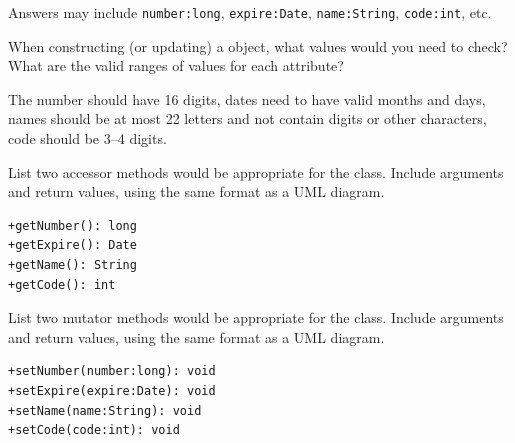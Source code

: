 \begin{answer}[5em]
Answers may include \verb|number:long|, \verb|expire:Date|, \verb|name:String|, \verb|code:int|, etc.
\end{answer}


\Q When constructing (or updating) a  object, what values would you need to check? What are the valid ranges of values for each attribute?

\begin{answer}[5em]
The number should have 16 digits, dates need to have valid months and days, names should be at most 22 letters and not contain digits or other characters, code should be 3--4 digits.
\end{answer}


\Q List two accessor methods would be appropriate for the  class.
Include arguments and return values, using the same format as a UML diagram.

\begin{answer}[5em]
\begin{verbatim}
+getNumber(): long
+getExpire(): Date
+getName(): String
+getCode(): int
\end{verbatim}
\end{answer}


\Q List two mutator methods would be appropriate for the  class.
Include arguments and return values, using the same format as a UML diagram.

\begin{answer}[5em]
\begin{verbatim}
+setNumber(number:long): void
+setExpire(expire:Date): void
+setName(name:String): void
+setCode(code:int): void
\end{verbatim}
\end{answer}
